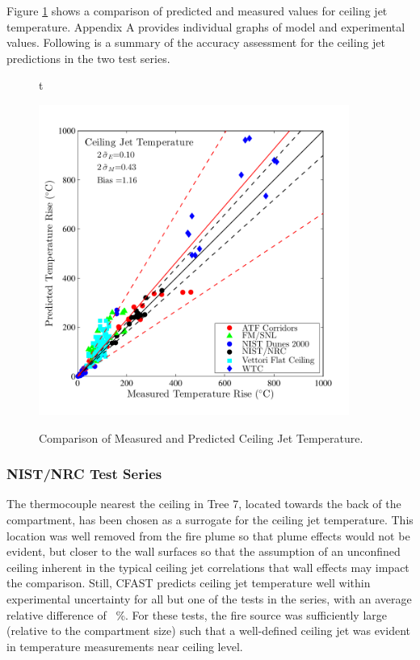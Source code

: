 Figure \ref{fig:Ceiling_Jet_Scatter} shows a comparison of predicted and measured values for ceiling jet temperature. Appendix A provides individual graphs of model and experimental values. Following is a summary of the accuracy assessment for the ceiling jet predictions in the two test series.

\begin{figure}{t}
\begin{center}
\includegraphics[width=4.0in]{FIGURES/ScatterPlots/Ceiling_Jet_Temperature}  \\
\end{center}
\caption{Comparison of Measured and Predicted Ceiling Jet Temperature.} \label{fig:Ceiling_Jet_Scatter}
\end{figure}

\subsubsection{NIST/NRC Test Series}

The thermocouple nearest the ceiling in Tree 7, located towards the back of the compartment, has been chosen as a surrogate for the ceiling jet temperature. This location was well removed from the fire plume so that plume effects would not be evident, but closer to the wall surfaces so that the assumption of an unconfined ceiling inherent in the typical ceiling jet correlations that wall effects may impact the comparison. Still, CFAST predicts ceiling jet temperature well within experimental uncertainty for all but one of the tests in the series, with an average relative difference of \CeilingJetnistnrc~\%.  For these tests, the fire source was sufficiently large (relative to the compartment size) such that a well-defined ceiling jet was evident in temperature measurements near ceiling level.

